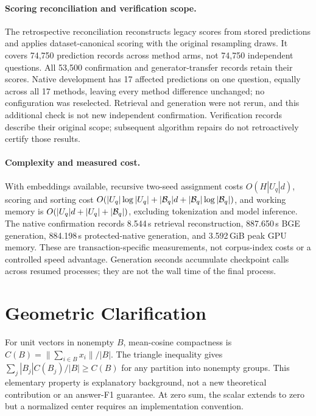 \documentclass[11pt]{article}
\begin{document}
\paragraph{Scoring reconciliation and verification scope.}
\label{app:scoring}
The retrospective reconciliation reconstructs legacy scores from stored
predictions and applies dataset-canonical scoring with the original
resampling draws. It covers 74,750 prediction records across method arms,
not 74,750 independent questions. All 53,500 confirmation and
generator-transfer records retain their scores. Native development has 17
affected predictions on one question, equally across all 17 methods, leaving
every method difference unchanged; no configuration was reselected.
Retrieval and generation were not rerun, and this additional check is not
new independent confirmation. Verification records describe their original
scope; subsequent algorithm repairs do not retroactively certify those results.

\paragraph{Complexity and measured cost.}
With embeddings available, recursive two-seed assignment costs
$O(H|U_q|d)$, scoring and sorting cost
$O(|U_q|\log|U_q|+|{\cal B}_q|d+|{\cal B}_q|\log|{\cal B}_q|)$,
and working memory is $O(|U_q|d+|U_q|+|{\cal B}_q|)$, excluding tokenization
and model inference. The native confirmation records 8.544\,s retrieval
reconstruction, 887.650\,s BGE generation, 884.198\,s protected-native
generation, and 3.592\,GiB peak GPU memory. These are transaction-specific
measurements, not corpus-index costs or a controlled speed advantage.
Generation seconds accumulate checkpoint calls across resumed processes;
they are not the wall time of the final process.

\section{Geometric Clarification}
\label{app:geometry}
For unit vectors in nonempty $B$, mean-cosine compactness is
$C(B)=\|\sum_{i\in B}x_i\|/|B|$. The triangle inequality gives
$\sum_j |B_j|C(B_j)/|B|\geq C(B)$ for any partition into nonempty groups.
This elementary property is explanatory background, not a new theoretical
contribution or an answer-F1 guarantee. At zero sum, the scalar extends to
zero but a normalized center requires an implementation convention.


\end{document}

